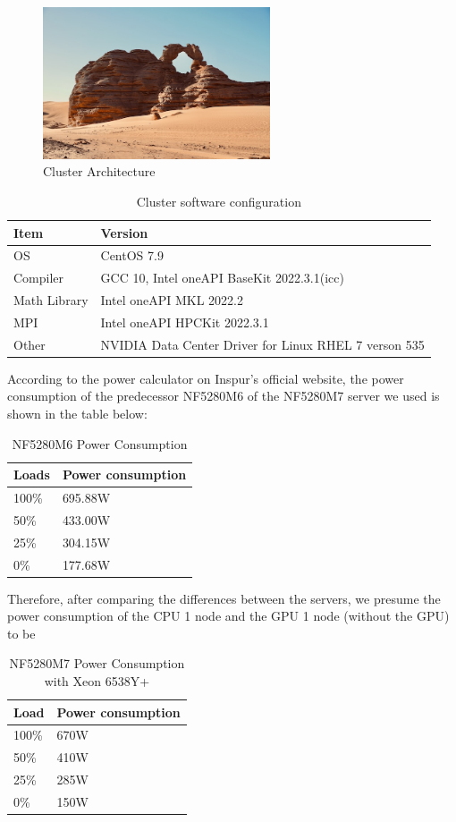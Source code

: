 \documentclass[a4paper,12pt]{article}
\begin{document}
\begin{figure}[H]
    \centering
    \includegraphics[width=0.6\textwidth]{Cluster_Architecture.png}
    \caption{Cluster Architecture}
    \label{fig:cluster_arch}
\end{figure}

\begin{table}[H]
\centering
\caption{Cluster software configuration}
\begin{tabular}{|l|l|}
\hline
Item & Version \\
\hline
OS & CentOS 7.9 \\
\hline
Compiler & GCC 10, Intel oneAPI BaseKit 2022.3.1(icc) \\
\hline
Math Library & Intel oneAPI MKL 2022.2 \\
\hline
MPI & Intel oneAPI HPCKit 2022.3.1 \\
\hline
Other & NVIDIA Data Center Driver for Linux RHEL 7 verson 535 \\
\hline
\end{tabular}
\end{table}

According to the power calculator on Inspur's official website, the power consumption of the predecessor NF5280M6 of the NF5280M7 server we used is shown in the table below:
\begin{table}[H]
\centering
\caption{NF5280M6 Power Consumption}
\begin{tabular}{|l|l|}
\hline
Loads & Power consumption \\
\hline
100\% & 695.88W \\
\hline
50\% & 433.00W \\
\hline
25\% & 304.15W \\
\hline
0\% & 177.68W \\
\hline
\end{tabular}
\end{table}

Therefore, after comparing the differences between the servers, we presume the power consumption of the CPU 1 node and the GPU 1 node (without the GPU) to be
\begin{table}[H]
\centering
\caption{NF5280M7 Power Consumption with Xeon 6538Y+}
\begin{tabular}{|l|l|}
\hline
Load & Power consumption \\
\hline
100\% & 670W \\
\hline
50\% & 410W \\
\hline
25\% & 285W \\
\hline
0\% & 150W \\
\hline
\end{tabular}
\end{table}
\end{document}
